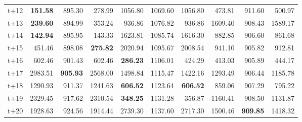 \begin{table}[H]
\begin{tabular}{lrrrrrrrrr}
t+12  & \textbf{151.58}  & 895.30  & 278.99  & 1056.80  & 1069.60  & 1056.80  & 473.81  & 911.60  & 500.97  \\
t+13  & \textbf{239.60}  & 894.99  & 353.24  & 936.86  & 1076.82  & 936.86  & 1609.40  & 908.43  & 1589.17  \\
t+14  & \textbf{142.94}  & 895.95  & 143.33  & 1623.81  & 1085.74  & 1616.30  & 882.85  & 906.60  & 861.68  \\
t+15  & 451.46  & 898.08  & \textbf{275.82}  & 2020.94  & 1095.67  & 2008.54  & 941.10  & 905.82  & 912.81  \\
t+16  & 602.46  & 901.43  & 602.46  & \textbf{286.23}  & 1106.01  & 424.29  & 413.03  & 905.89  & 444.17  \\
t+17  & 2983.51  & \textbf{905.93}  & 2568.00  & 1498.84  & 1115.47  & 1422.16  & 1293.49  & 906.44  & 1185.78  \\
t+18  & 1290.93  & 911.37  & 1241.63  & \textbf{606.52}  & 1123.64  & \textbf{606.52}  & 859.06  & 907.29  & 795.22  \\
t+19  & 2329.45  & 917.62  & 2310.54  & \textbf{348.25}  & 1131.28  & 356.87  & 1160.41  & 908.50  & 1131.87  \\
t+20  & 1928.63  & 924.56  & 1914.44  & 2739.30  & 1137.60  & 2717.30  & 1500.46  & \textbf{909.85}  & 1418.32  \\

\bottomrule
\end{tabular}
\end{table}

